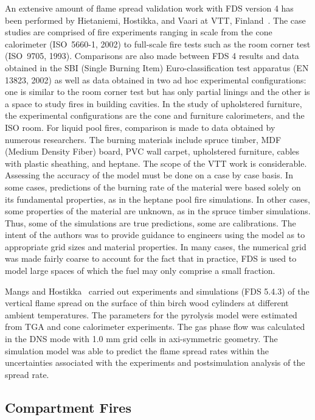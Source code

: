 An extensive amount of flame spread validation work with FDS version 4 has been performed  by  Hietaniemi,  Hostikka,  and  Vaari  at  VTT, Finland~\cite{Hietaniemi:1}. The case studies are comprised of fire experiments ranging in scale from the cone calorimeter (ISO~5660-1, 2002) to full-scale fire tests such as the room corner test (ISO~9705, 1993). Comparisons are also made between FDS 4 results and data obtained in the SBI (Single Burning Item) Euro-classification test apparatus (EN 13823, 2002) as well as data obtained in two ad hoc experimental configurations: one is similar to the room corner test but has only partial linings and the other is a space to study fires in building cavities. In the study of upholstered furniture, the experimental configurations are the cone and furniture calorimeters, and the ISO room. For liquid pool fires, comparison is made to data obtained by numerous researchers.  The burning materials include spruce timber, MDF (Medium Density Fiber) board, PVC wall carpet, upholstered furniture, cables with plastic sheathing, and heptane. The scope of the VTT work is considerable. Assessing the accuracy of the model must be done on a case by case basis. In some cases, predictions of the burning rate of the material were based solely on its fundamental properties, as in the heptane pool fire simulations. In other cases, some properties of the material are unknown, as in the spruce timber simulations. Thus, some of the simulations are true predictions, some are calibrations. The intent of the authors was to provide guidance to engineers using the model as to appropriate grid sizes and material properties. In many cases, the numerical grid was made fairly coarse to account for the fact that in practice, FDS is used to model large spaces of which the fuel may only comprise a small fraction.

Mangs and Hostikka~\cite{Mangs_Hostikka:IAFSS10} carried out experiments and simulations (FDS 5.4.3) of the vertical flame spread on the surface of thin birch wood cylinders at different ambient temperatures. The parameters for the pyrolysis model were estimated from TGA and cone calorimeter experiments. The gas phase flow was calculated in the DNS mode with 1.0 mm grid cells in axi-symmetric geometry. The simulation model was able to predict the flame spread rates within the uncertainties associated with the experiments and postsimulation analysis of the spread rate.


\subsection{Compartment Fires}

